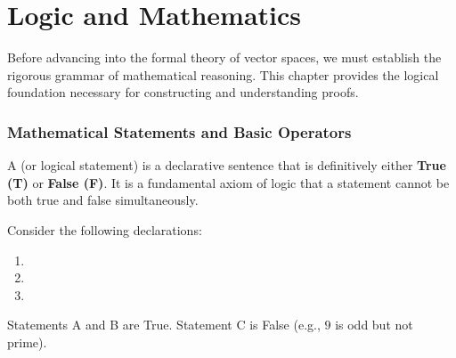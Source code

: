 \renewcommand{\thetheorem}{2.\arabic{theorem}}
\setcounter{theorem}{0}
\setcounter{chapter}{1}
%

\chapter{Logic and Mathematics}

Before advancing into the formal theory of vector spaces, we must establish the rigorous grammar of mathematical reasoning. This chapter provides the logical foundation necessary for constructing and understanding proofs.

\subsection{Mathematical Statements and Basic Operators}

\begin{definition}
\label{def:mathematical_statement}
A  (or logical statement) is a declarative sentence that is definitively either \textbf{True (T)} or \textbf{False (F)}. It is a fundamental axiom of logic that a statement cannot be both true and false simultaneously.
\end{definition}

\begin{example}
Consider the following declarations:
\begin{enumerate}[label=\textbf{\Alph*}:]
    \item {}
    \item {}
    \item {}
\end{enumerate}
Statements A and B are True. Statement C is False (e.g., $9$ is odd but not prime).
\end{example}

